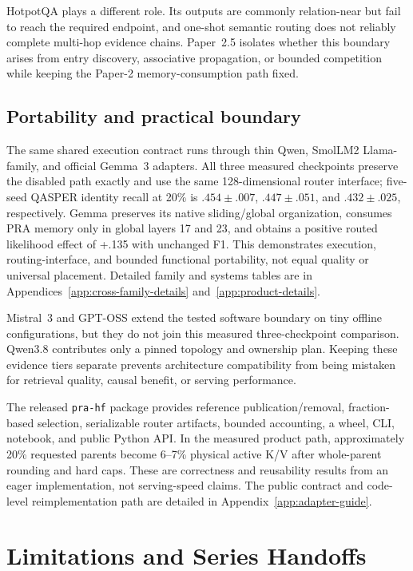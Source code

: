 \documentclass[11pt]{article}
\begin{document}
HotpotQA plays a different role.  Its outputs are commonly relation-near but fail to reach the
required endpoint, and one-shot semantic routing does not reliably complete multi-hop evidence
chains. Paper~2.5 isolates whether this boundary arises from entry discovery, associative
propagation, or bounded competition while keeping the Paper-2 memory-consumption path fixed.

\subsection{Portability and practical boundary}

The same shared execution contract runs through thin Qwen, SmolLM2 Llama-family, and official
Gemma~3 adapters.  All three measured checkpoints preserve the disabled path exactly and use the
same 128-dimensional router interface; five-seed QASPER identity recall at 20\% is
$.454\pm.007$, $.447\pm.051$, and $.432\pm.025$, respectively.  Gemma preserves its native
sliding/global organization, consumes PRA memory only in global layers 17 and 23, and obtains a
positive routed likelihood effect of +.135 with unchanged F1.  This demonstrates execution,
routing-interface, and bounded functional portability, not equal quality or universal placement.
Detailed family and systems tables are in Appendices~\ref{app:cross-family-details}
and~\ref{app:product-details}.

Mistral~3 and GPT-OSS extend the tested software boundary on tiny offline configurations, but they
do not join this measured three-checkpoint comparison. Qwen3.8 contributes only a pinned topology
and ownership plan. Keeping these evidence tiers separate prevents architecture compatibility from
being mistaken for retrieval quality, causal benefit, or serving performance.

The released \texttt{pra-hf} package provides reference publication/removal, fraction-based
selection, serializable router artifacts, bounded accounting, a wheel, CLI, notebook, and public
Python API.  In the measured product path, approximately 20\% requested parents become 6--7\%
physical active K/V after whole-parent rounding and hard caps.  These are correctness and
reusability results from an eager implementation, not serving-speed claims. The public contract
and code-level reimplementation path are detailed in Appendix~\ref{app:adapter-guide}.

\section{Limitations and Series Handoffs}
\end{document}
